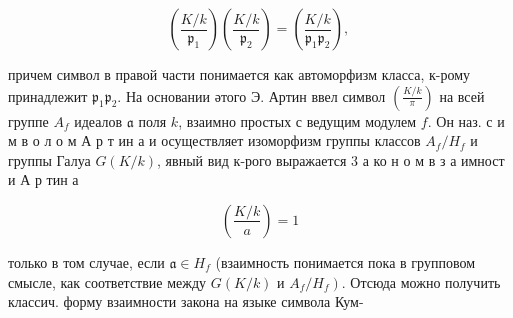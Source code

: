 \documentclass[10pt]{article}
\begin{document}
\[

\left(\frac{K / k}{\mathfrak{p}_{1}}\right)\left(\frac{K / k}{\mathfrak{p}_{2}}\right)=\left(\frac{K / k}{\mathfrak{p}_{1} \mathfrak{p}_{2}}\right) \text {, }

\]



причем символ в правой части понимается как автоморфизм класса, к-рому принадлежит $\mathfrak{p}_{1} \mathfrak{p}_{2}$. На основании әтого Э. Артин ввел символ $\left(\frac{K / k}{\mathfrak{\pi}}\right)$ на всей группе $A_{f}$ идеалов $\mathfrak{a}$ поля $k$, взаимно простых с ведущим модулем $f$. Он наз. с и м в о л о м А р т ин а и осуществляет изоморфизм группы классов $A_{f} / H_{f}$ и группы Галуа $G(K / k)$, явный вид к-рого выражается 3 а ко н о м в $з$ а имност и А р тин а



\[

\left(\frac{K / k}{a}\right)=1

\]



только в том случае, если $\mathfrak{a} \in H_{f}$ (взаимность понимается пока в групповом смысле, как соответствие между $G(K / k)$ и $\left.A_{f} / H_{f}\right)$. Отсюда можно получить классич. форму взаимности закона на языке символа Кум-
\end{document}
